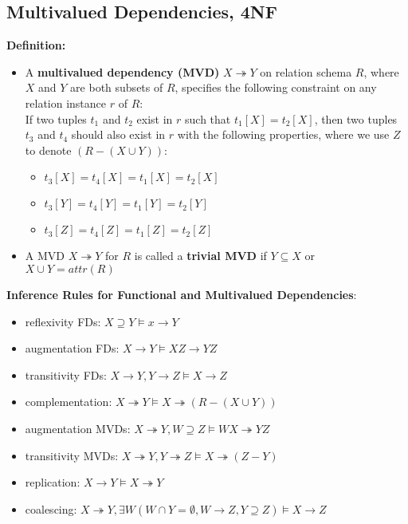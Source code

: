 \subsection{Multivalued Dependencies, 4NF}
\textbf{Definition:}
\begin{itemize}[label=\(\rhd\)]
    \item A \textbf{multivalued dependency (MVD)} $X \twoheadrightarrow Y$ on relation schema $R$, where $X$ and $Y$ are both subsets of $R$, specifies the following constraint on any relation instance $r$ of $R$:\\
    If two tuples $t_1$ and $t_2$ exist in $r$ such that $t_1[X]=t_2[X]$, then two tuples $t_3$ and $t_4$ should also exist in $r$ with the following properties, where we use $Z$ to denote $(R-(X\cup Y))$:
    \begin{itemize}[label=\(\rhd\)]
        \item $t_3[X]=t_4[X]=t_1[X]=t_2[X]$
        \item $t_3[Y]=t_4[Y]=t_1[Y]=t_2[Y]$
        \item $t_3[Z]=t_4[Z]=t_1[Z]=t_2[Z]$
    \end{itemize}
    \item A MVD $X \twoheadrightarrow Y$ for $R$ is called a \textbf{trivial MVD} if $Y \subseteq X$ or $X\cup Y = attr(R)$
\end{itemize}

\textbf{Inference Rules for Functional and Multivalued Dependencies}:
\begin{itemize}[label=\(\rhd\)]
    \item reflexivity FDs: $X\supseteq Y \models x \rightarrow Y$
    \item augmentation FDs: $X\rightarrow Y \models XZ \rightarrow YZ$
    \item transitivity FDs: $X\rightarrow Y, Y \rightarrow Z \models X \rightarrow Z$
    \item complementation: $X \twoheadrightarrow Y \models X \twoheadrightarrow (R-(X\cup Y))$
    \item augmentation MVDs: $X\twoheadrightarrow Y, W \supseteq Z \models WX \twoheadrightarrow YZ$
    \item transitivity MVDs: $X \twoheadrightarrow Y, Y \twoheadrightarrow Z \models X \twoheadrightarrow (Z-Y)$
    \item replication: $X\rightarrow Y \models X \twoheadrightarrow Y$
    \item coalescing: $X \twoheadrightarrow Y, \exists W(W\cap Y = \emptyset, W \rightarrow Z, Y \supseteq Z) \models X \rightarrow Z$ 
\end{itemize}


